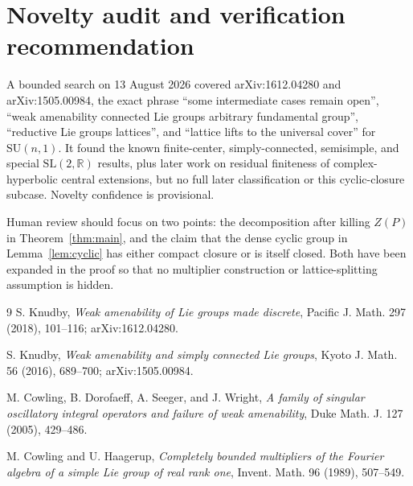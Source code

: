 \documentclass[11pt]{article}
\begin{document}
\section{Novelty audit and verification recommendation}

A bounded search on 13 August 2026 covered arXiv:1612.04280 and
arXiv:1505.00984, the exact phrase ``some intermediate cases remain open'',
``weak amenability connected Lie groups arbitrary fundamental group'',
``reductive Lie groups lattices'', and ``lattice lifts to the universal
cover'' for $\mathrm{SU}(n,1)$.  It found the known finite-center,
simply-connected, semisimple, and special $\mathrm{SL}(2,\mathbb R)$
results, plus later work on residual finiteness of complex-hyperbolic
central extensions, but no full later classification or this cyclic-closure
subcase.  Novelty confidence is provisional.

Human review should focus on two points: the decomposition after killing
$Z(P)$ in Theorem~\ref{thm:main}, and the claim that the dense cyclic group
in Lemma~\ref{lem:cyclic} has either compact closure or is itself closed.
Both have been expanded in the proof so that no multiplier construction or
lattice-splitting assumption is hidden.

\begin{thebibliography}{9}
S. Knudby,
\emph{Weak amenability of Lie groups made discrete},
Pacific J. Math. 297 (2018), 101--116;
arXiv:1612.04280.

S. Knudby,
\emph{Weak amenability and simply connected Lie groups},
Kyoto J. Math. 56 (2016), 689--700;
arXiv:1505.00984.

M. Cowling, B. Dorofaeff, A. Seeger, and J. Wright,
\emph{A family of singular oscillatory integral operators and failure of
weak amenability},
Duke Math. J. 127 (2005), 429--486.

M. Cowling and U. Haagerup,
\emph{Completely bounded multipliers of the Fourier algebra of a simple Lie
group of real rank one},
Invent. Math. 96 (1989), 507--549.
\end{thebibliography}
\end{document}
